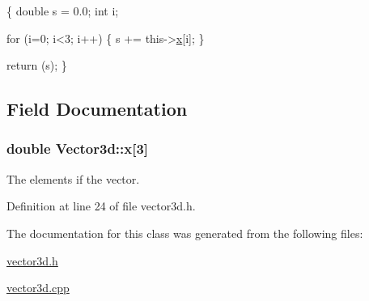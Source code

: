 \begin{DoxyCode}
\{
  \textcolor{keywordtype}{double} s = 0.0;
  \textcolor{keywordtype}{int} i;
  
  \textcolor{keywordflow}{for} (i=0; i<3; i++)
    \{
      s += this->\hyperlink{classVector3d_ae5e82a2be7cc2e195e56875a5befe509}{x}[i];
    \}
  
  \textcolor{keywordflow}{return} (s);
\}
\end{DoxyCode}


\subsection{Field Documentation}
\hypertarget{classVector3d_ae5e82a2be7cc2e195e56875a5befe509}{
\subsubsection[{x}]{\setlength{\rightskip}{0pt plus 5cm}double Vector3d\-::x\mbox{[}3\mbox{]}\hspace{0.3cm}{\ttfamily [protected]}}}\label{df/dd0/classVector3d_ae5e82a2be7cc2e195e56875a5befe509}
The elements if the vector. 

Definition at line 24 of file vector3d.\-h.



The documentation for this class was generated from the following files\-:\begin{DoxyCompactItemize}
\item 
\hyperlink{vector3d_8h}{vector3d.\-h}\item 
\hyperlink{vector3d_8cpp}{vector3d.\-cpp}\end{DoxyCompactItemize}
